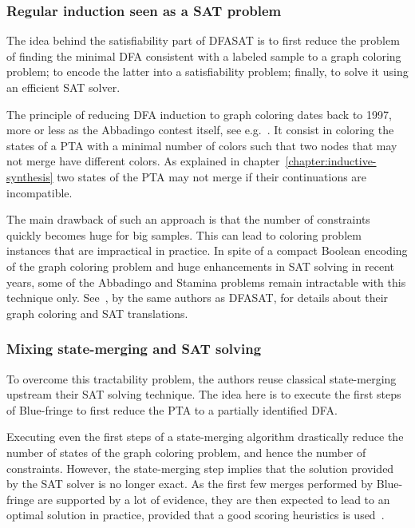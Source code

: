 \subsubsection*{Regular induction seen as a SAT problem}

The idea behind the satisfiability part of DFASAT is to first reduce the problem of finding the minimal DFA consistent with a labeled sample to a graph coloring problem; to encode the latter into a satisfiability problem; finally, to solve it using an efficient SAT solver. 

The principle of reducing DFA induction to graph coloring dates back to 1997, more or less as the Abbadingo contest itself, see e.g.~\cite{Coste:1997}. It consist in coloring the states of a PTA with a minimal number of colors such that two nodes that may not merge have different colors. As explained in chapter~\ref{chapter:inductive-synthesis} two states of the PTA may not merge if their continuations are incompatible.

The main drawback of such an approach is that the number of constraints quickly becomes huge for big samples. This can lead to coloring problem instances that are impractical in practice. In spite of a compact Boolean encoding of the graph coloring problem and huge enhancements in SAT solving in recent years, some of the Abbadingo and Stamina problems remain intractable with this technique only. See~\cite{Heule:2010}, by the same authors as DFASAT, for details about their graph coloring and SAT translations.

\subsubsection*{Mixing state-merging and SAT solving}

To overcome this tractability problem, the authors reuse classical state-merging upstream their SAT solving technique. The idea here is to execute the first steps of Blue-fringe to first reduce the PTA to a partially identified DFA. 

Executing even the first steps of a state-merging algorithm drastically reduce the number of states of the graph coloring problem, and hence the number of constraints. However, the state-merging step implies that the solution provided by the SAT solver is no longer exact. As the first few merges performed by Blue-fringe are supported by a lot of evidence, they are then expected to lead to an optimal solution in practice, provided that a good scoring heuristics is used~\cite{Heule:2010}. 

